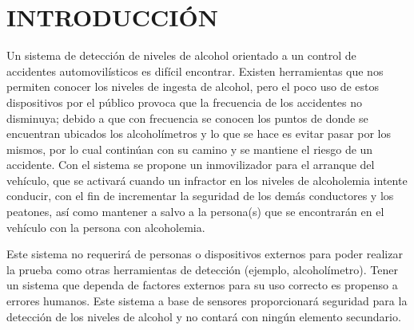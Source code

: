 \section{INTRODUCCIÓN}
Un sistema de detección de niveles de alcohol orientado a un control de accidentes automovilísticos es difícil encontrar. Existen herramientas que nos permiten conocer los niveles de ingesta de alcohol, pero el poco uso de estos dispositivos por el público provoca que la frecuencia de los accidentes no disminuya; debido a que con frecuencia se conocen los puntos de donde se encuentran ubicados los alcoholímetros y lo que se hace es evitar pasar por los mismos, por lo cual continúan con su camino y se mantiene el riesgo de un accidente.  Con el sistema se propone un inmovilizador para el arranque del vehículo, que se activará cuando un infractor en los niveles de alcoholemia intente conducir, con el fin de incrementar la seguridad de los demás conductores y los peatones, así como mantener a salvo a la persona(s) que se encontrarán en el vehículo con la persona con alcoholemia.\par
Este sistema no requerirá de personas o dispositivos externos para poder realizar la prueba como otras herramientas de detección (ejemplo, alcoholímetro). Tener un sistema que dependa de factores externos para su uso correcto es propenso a errores humanos. Este sistema a base de sensores proporcionará seguridad para la detección de los niveles de alcohol y no contará con ningún elemento secundario.